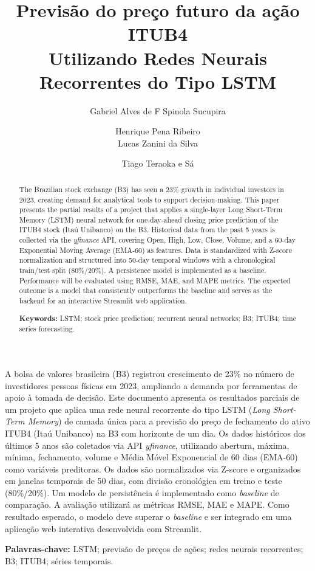 \documentclass[12pt]{article}
\title{Previsão do preço futuro da ação ITUB4\\
       Utilizando Redes Neurais Recorrentes do Tipo LSTM}
\author{Gabriel Alves de F Spinola Sucupira\inst{1} \and Henrique Pena Ribeiro\inst{1}\\
        Lucas Zanini da Silva\inst{1} \and Tiago Teraoka e Sá \inst{1}}
\begin{document}
\maketitle

\begin{resumo}
A bolsa de valores brasileira (B3) registrou crescimento de 23\% no número
de investidores pessoas físicas em 2023, ampliando a demanda por ferramentas
de apoio à tomada de decisão. Este documento apresenta os resultados parciais
de um projeto que aplica uma rede neural recorrente do tipo LSTM
(\textit{Long Short-Term Memory}) de camada única para a previsão do preço
de fechamento do ativo ITUB4 (Itaú Unibanco) na B3 com horizonte de um dia.
Os dados históricos dos últimos 5 anos são coletados via API
\textit{yfinance}, utilizando abertura, máxima, mínima, fechamento,
volume e Média Móvel Exponencial de 60 dias (EMA-60) como variáveis
preditoras. Os dados são normalizados via Z-score e organizados em janelas
temporais de 50 dias, com divisão cronológica em treino e teste
(80\%/20\%). Um modelo de persistência é implementado como
\textit{baseline} de comparação. A avaliação utilizará as métricas RMSE,
MAE e MAPE. Como resultado esperado, o modelo deve superar o
\textit{baseline} e ser integrado em uma aplicação web interativa
desenvolvida com Streamlit.

\vspace{0.5em}\noindent\textbf{Palavras-chave:} LSTM; previsão de preços
de ações; redes neurais recorrentes; B3; ITUB4; séries temporais.
\end{resumo}

\begin{abstract}
The Brazilian stock exchange (B3) has seen a 23\% growth in individual
investors in 2023, creating demand for analytical tools to support
decision-making. This paper presents the partial results of a project that
applies a single-layer Long Short-Term Memory (LSTM) neural network for
one-day-ahead closing price prediction of the ITUB4 stock (Itaú Unibanco)
on the B3. Historical data from the past 5 years is collected via the
\textit{yfinance} API, covering Open, High, Low, Close, Volume, and
a 60-day Exponential Moving Average (EMA-60) as features. Data is
standardized with Z-score normalization and structured into 50-day temporal
windows with a chronological train/test split (80\%/20\%).
A persistence model is implemented as a baseline. Performance will be
evaluated using RMSE, MAE, and MAPE metrics. The expected outcome is
a model that consistently outperforms the baseline and serves as the backend
for an interactive Streamlit web application.

\vspace{0.5em}\noindent\textbf{Keywords:} LSTM; stock price prediction;
recurrent neural networks; B3; ITUB4; time series forecasting.
\end{abstract}
\end{document}

